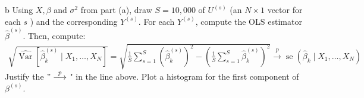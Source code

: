 \documentclass{article}
\begin{document}
\FloatBarrier
\begin{problem}{b}
Using $X, \beta$ and $\sigma^{2}$ from part (a), draw $S=10,000$ of $U^{(s)}$ (an $N \times 1$ vector for each $s$ ) and the corresponding $Y^{(s)}$. For each $Y^{(s)}$, compute the OLS estimator $\hat{\beta}^{(s)}$. Then, compute:
    \begin{align*}
        \sqrt{\widehat{\operatorname{Var}}\left[\hat{\beta}_{k}^{(s)} \mid X_{1}, \ldots, X_{N}\right]}=\sqrt{\frac{1}{S} \sum_{s=1}^{S}\left(\hat{\beta}_{k}^{(s)}\right)^{2}-\left(\frac{1}{S} \sum_{s=1}^{S} \hat{\beta}_{k}^{(s)}\right)^{2}} \stackrel{p}{\longrightarrow} \operatorname{se}\left(\hat{\beta}_{k} \mid X_{1}, \ldots, X_{N}\right)
    \end{align*}
    Justify the $" \stackrel{p}{\longrightarrow}$ " in the line above. Plot a histogram for the first component of $\beta^{(s)}$.
\end{problem}
\end{document}
